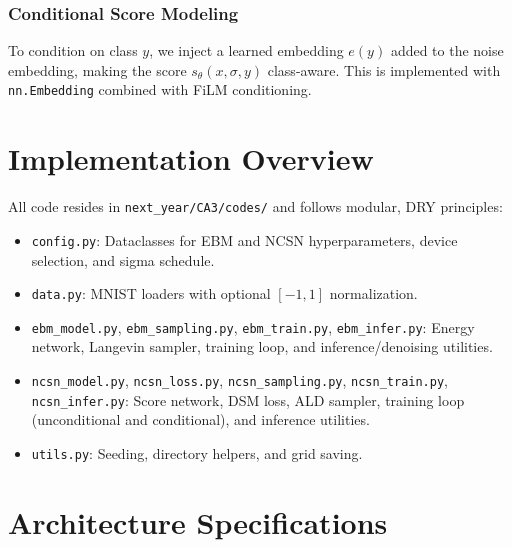 \documentclass[conference]{IEEEtran}
\begin{document}
\subsubsection{Conditional Score Modeling}
To condition on class $y$, we inject a learned embedding $e(y)$ added to the noise embedding, making the score $s_\theta(x, \sigma, y)$ class-aware. This is implemented with \texttt{nn.Embedding} combined with FiLM conditioning.

\section{Implementation Overview}
All code resides in \texttt{next\_year/CA3/codes/} and follows modular, DRY principles:
\begin{itemize}[leftmargin=*]
    \item \texttt{config.py}: Dataclasses for EBM and NCSN hyperparameters, device selection, and sigma schedule.
    \item \texttt{data.py}: MNIST loaders with optional $[-1,1]$ normalization.
    \item \texttt{ebm\_model.py}, \texttt{ebm\_sampling.py}, \texttt{ebm\_train.py}, \texttt{ebm\_infer.py}: Energy network, Langevin sampler, training loop, and inference/denoising utilities.
    \item \texttt{ncsn\_model.py}, \texttt{ncsn\_loss.py}, \texttt{ncsn\_sampling.py}, \texttt{ncsn\_train.py}, \texttt{ncsn\_infer.py}: Score network, DSM loss, ALD sampler, training loop (unconditional and conditional), and inference utilities.
    \item \texttt{utils.py}: Seeding, directory helpers, and grid saving.
\end{itemize}

\section{Architecture Specifications}
\end{document}
